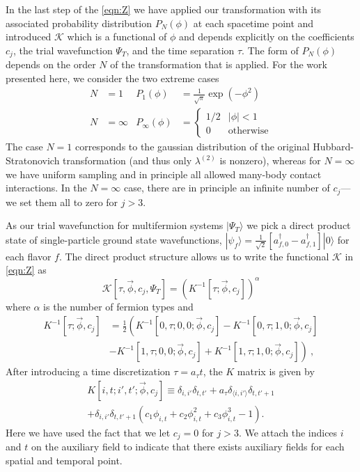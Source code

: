 \documentclass[aps,prl,twocolumn,showpacs,superscriptaddress,groupedaddress, final, nofootinbib]{revtex4}  %
\newcommand{\K}{\ensuremath{\mathcal{K}}}
\begin{document}
In the last step of the \eqref{eqn:Z} we have applied our transformation with its associated probability distribution $P_N(\phi)$ at each spacetime point and introduced $\K$ which is a functional of $\phi$ and depends explicitly on the coefficients $c_j$, the trial wavefunction $\Psi_T$, and the time separation $\tau$. The form of $P_N(\phi)$ depends on the order $N$ of the transformation that is applied.  For the work presented here, we consider the two extreme cases
\begin{align}
    N&=1        & P_1(\phi) &= \frac{1}{\sqrt{\pi}}\exp\left(-\phi^2\right)   \\
    N&=\infty   & P_\infty(\phi) &= \begin{cases}
        1/2 & |\phi| < 1 \\
        0 & \text{otherwise}
        \end{cases}
\end{align}
The case $N=1$ corresponds to the gaussian distribution of the original Hubbard-Stratonovich transformation (and thus only $\lambda^{(2)}$ is nonzero), whereas for $N=\infty$ we have uniform sampling and in principle all allowed many-body contact interactions.  In the $N=\infty$ case, there are in principle an infinite number of $c_j$---we set them all to zero for $j>3$.

As our trial wavefunction for multifermion systems $|\Psi_T\rangle$ we pick a direct product state of single-particle ground state wavefunctions, $|\psi_f\rangle = \frac{1}{\sqrt{2}}[a^\dag_{f,0}-a^\dag_{f,1}]|0\rangle$ for each flavor $f$.
The direct product structure allows us to write the functional $\K$ in \eqref{eqn:Z} as
\begin{equation}
    \K[\tau,\vec{\phi},c_j,\Psi_T]=\left(K^{-1}[\tau;\vec{\phi},c_j]\right)^\alpha
\end{equation}
where $\alpha$ is the number of fermion types and 
{\small\begin{align}
K^{-1}[\tau;\vec{\phi},c_j] &=\frac{1}{2}\left(
K^{-1}[0,\tau;0,0;\vec{\phi},c_j] -K^{-1}[0,\tau;1,0;\vec{\phi},c_j]\right.                             \nonumber\\
&\left.-K^{-1}[1,\tau;0,0;\vec{\phi},c_j]
+K^{-1}[1,\tau;1,0;\vec{\phi},c_j]\right)\ ,
\end{align}}
After introducing a time discretization $\tau = a_\tau t$, the $K$ matrix is given by
\begin{align}
K[i,t;i',t';\vec{\phi},c_j]\equiv   \delta_{i,i'}\delta_{t,t'}+a_\tau\delta_{\langle i,i'\rangle}\delta_{t,t'+1} \nonumber\\
                                    +\delta_{i,i'}\delta_{t,t'+1}\left(c_1\phi_{i,t}+c_2\phi_{i,t}^2+c_3\phi_{i,t}^3-1\right).
\end{align}
Here we have used the fact that we let $c_j=0$ for $j>3$.   We attach the indices $i$ and $t$ on the auxiliary field to indicate that there exists auxiliary fields for each spatial and temporal point.
\end{document}
